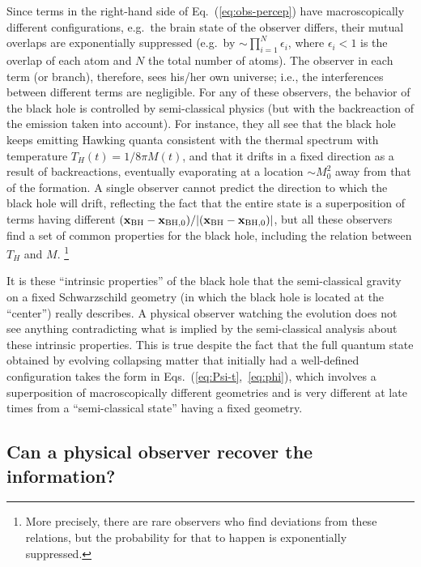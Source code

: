 \documentclass[12pt]{article}
\begin{document}
Since terms in the right-hand side of Eq.~(\ref{eq:obs-percep}) have 
macroscopically different configurations, e.g.\ the brain state of the 
observer differs, their mutual overlaps are exponentially suppressed 
(e.g.\ by $\sim \prod_{i=1}^N \epsilon_i$, where $\epsilon_i < 1$ is 
the overlap of each atom and $N$ the total number of atoms).  The observer 
in each term (or branch), therefore, sees his/her own universe; i.e., 
the interferences between different terms are negligible.  For any 
of these observers, the behavior of the black hole is controlled by 
semi-classical physics (but with the backreaction of the emission taken 
into account).  For instance, they all see that the black hole keeps 
emitting Hawking quanta consistent with the thermal spectrum with 
temperature $T_H(t) = 1/8\pi M(t)$, and that it drifts in a fixed direction 
as a result of backreactions, eventually evaporating at a location 
$\sim M_0^2$ away from that of the formation.  A single observer cannot 
predict the direction to which the black hole will drift, reflecting 
the fact that the entire state is a superposition of terms having 
different $({\bf x}_{\rm BH} - {\bf x}_{{\rm BH},0})/|({\bf x}_{\rm BH} 
- {\bf x}_{{\rm BH},0})|$, but all these observers find a set of common 
properties for the black hole, including the relation between $T_H$ and 
$M$.%
\footnote{More precisely, there are rare observers who find deviations 
 from these relations, but the probability for that to happen is 
 exponentially suppressed.}

It is these ``intrinsic properties'' of the black hole that the 
semi-classical gravity on a fixed Schwarzschild geometry (in which 
the black hole is located at the ``center'') really describes.  A physical 
observer watching the evolution does not see anything contradicting 
what is implied by the semi-classical analysis about these intrinsic 
properties.  This is true despite the fact that the full quantum state 
obtained by evolving collapsing matter that initially had a well-defined 
configuration takes the form in Eqs.~(\ref{eq:Psi-t},~\ref{eq:phi}), 
which involves a superposition of macroscopically different geometries 
and is very different at late times from a ``semi-classical state'' 
having a fixed geometry.


\subsection{Can a physical observer recover the information?}
\label{subsec:info_recov}
\end{document}
